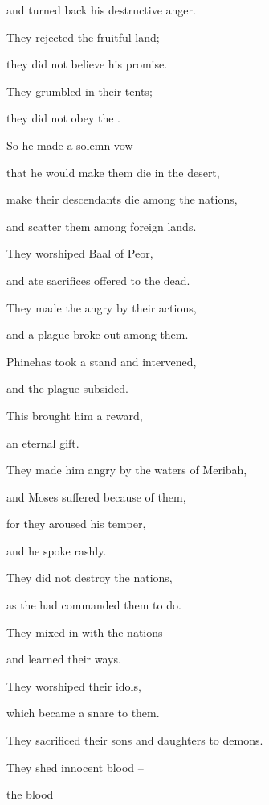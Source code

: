 {\par }{\Q and turned back
his destructive
anger.
\par }{\Q {}They rejected
the fruitful
land;
\par }{\Q they did not
believe
his promise.
\par }{\Q {}They grumbled
in their tents;
\par }{\Q they did not
obey
the {}.
\par }{\Q {}So he made a solemn
vow

\par }{\Q that he would make them
die
in the desert,
\par }{\Q {}make their descendants
die
among the nations,
\par }{\Q and scatter
them among foreign lands.
\par }{\Q {}They worshiped
Baal of Peor,
\par }{\Q and ate
sacrifices offered
to the dead.
\par }{\Q {}They made the
{} angry
by their actions,
\par }{\Q and a plague
broke out among them.
\par }{\Q {}Phinehas
took a stand
and intervened,
\par }{\Q and the plague
subsided.
\par }{\Q {}This brought
him a reward,
\par }{\Q an eternal
gift.
\par }{\Q {}They made him angry
by
the waters
of Meribah,
\par }{\Q and Moses
suffered because of them,
\par }{\Q {}for
they aroused
his temper,
\par }{\Q and he spoke
rashly.
\par }{\Q {}They did not
destroy
the nations,
\par }{\Q as
the
{}
had commanded
them to do.
\par }{\Q {}They mixed
in with the nations
\par }{\Q and learned
their ways.
\par }{\Q {}They worshiped
their idols,
\par }{\Q which became
a snare
to them.
\par }{\Q {}They sacrificed
their sons
and daughters
to demons.
\par }{\Q {}They shed
innocent
blood
–
\par }{\Q the blood
}
